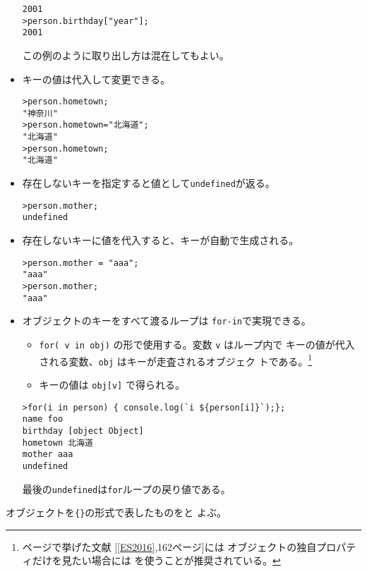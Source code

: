\begin{Exec}
\begin{itemize}
\begin{Verbatim}
2001
>person.birthday["year"];
2001
\end{Verbatim}
この例のように取り出し方は混在してもよい。
 \item キーの値は代入して変更できる。
\begin{Verbatim}
>person.hometown;
"神奈川"
>person.hometown="北海道";
"北海道"
>person.hometown;
"北海道"
\end{Verbatim}
 \item 存在しないキーを指定すると値として\Verb+undefined+が返る。
\begin{Verbatim}
>person.mother;
undefined
\end{Verbatim}
 \item 存在しないキーに値を代入すると、キーが自動で生成される。
\begin{Verbatim}
>person.mother = "aaa";
"aaa"
>person.mother;
"aaa"
\end{Verbatim}
 \item オブジェクトのキーをすべて渡るループは \verb+for-in+で実現できる。
\begin{itemize}
 \item \verb+for( v in obj)+ の形で使用する。変数 \verb+v+ はループ内で
       キーの値が代入される変数、\verb+obj+ はキーが走査されるオブジェク
       トである。\footnote{\pageref{ES2016}ページで挙げた文献
       [\ref{ES2016},162ページ]には
			 オブジェクトの独自プロパティだけを見たい場合には
       を使うことが推奨されている。}
 \item キーの値は \verb+obj[v]+ で得られる。
\end{itemize}
\begin{Verbatim}
>for(i in person) { console.log(`i ${person[i]}`);};
name foo
birthday [object Object]
hometown 北海道
mother aaa
undefined
\end{Verbatim}
最後の\Verb+undefined+は\Verb+for+ループの戻り値である。
\end{itemize}
\end{Exec}
オブジェクトを\Verb+{}+の形式で表したものをと
よぶ。
